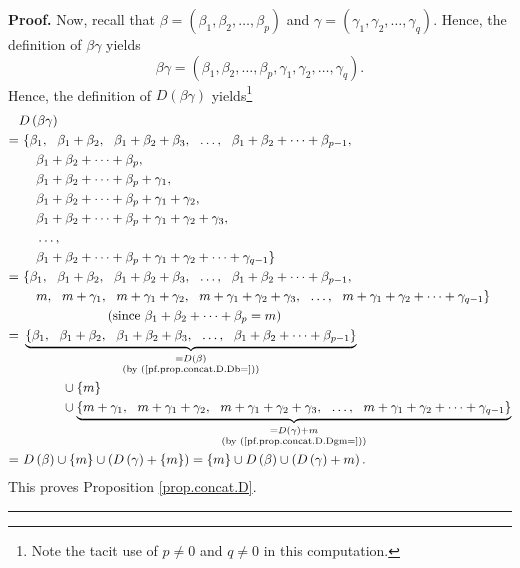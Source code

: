 \documentclass[numbers=enddot,12pt,final,onecolumn,notitlepage]{scrartcl}%
\theoremstyle{definition}
\newenvironment{proof}[1][Proof]{\noindent\textbf{#1.} }{\ \rule{0.5em}{0.5em}}
\begin{document}
\begin{proof}
Now, recall that $\beta=\left(  \beta_{1},\beta_{2},\ldots,\beta_{p}\right)  $
and $\gamma=\left(  \gamma_{1},\gamma_{2},\ldots,\gamma_{q}\right)  $. Hence,
the definition of $\beta\gamma$ yields%
\[
\beta\gamma=\left(  \beta_{1},\beta_{2},\ldots,\beta_{p},\gamma_{1},\gamma
_{2},\ldots,\gamma_{q}\right)  .
\]
Hence, the definition of $D\left(  \beta\gamma\right)  $ yields\footnote{Note
the tacit use of $p\neq0$ and $q\neq0$ in this computation.}%
\begin{align*}
&  D\left(  \beta\gamma\right) \\
=  &  \ \{\beta_{1},\ \ \beta_{1}+\beta_{2},\ \ \beta_{1}+\beta_{2}+\beta
_{3},\ \ \ldots,\ \ \beta_{1}+\beta_{2}+\cdots+\beta_{p-1},\\
&  \ \ \ \ \beta_{1}+\beta_{2}+\cdots+\beta_{p},\\
&  \ \ \ \ \beta_{1}+\beta_{2}+\cdots+\beta_{p}+\gamma_{1},\\
&  \ \ \ \ \beta_{1}+\beta_{2}+\cdots+\beta_{p}+\gamma_{1}+\gamma_{2},\\
&  \ \ \ \ \beta_{1}+\beta_{2}+\cdots+\beta_{p}+\gamma_{1}+\gamma_{2}%
+\gamma_{3},\\
&  \ \ \ \ \ldots,\\
&  \ \ \ \ \beta_{1}+\beta_{2}+\cdots+\beta_{p}+\gamma_{1}+\gamma_{2}%
+\cdots+\gamma_{q-1}\}\\
=  &  \ \{\beta_{1},\ \ \beta_{1}+\beta_{2},\ \ \beta_{1}+\beta_{2}+\beta
_{3},\ \ \ldots,\ \ \beta_{1}+\beta_{2}+\cdots+\beta_{p-1},\\
&  \ \ \ \ m,\ \ m+\gamma_{1},\ \ m+\gamma_{1}+\gamma_{2},\ \ m+\gamma
_{1}+\gamma_{2}+\gamma_{3},\ \ \ldots,\ \ m+\gamma_{1}+\gamma_{2}%
+\cdots+\gamma_{q-1}\}\\
&  \ \ \ \ \ \ \ \ \ \ \ \ \ \ \ \ \ \ \ \ \left(  \text{since }\beta
_{1}+\beta_{2}+\cdots+\beta_{p}=m\right) \\
=  &  \ \underbrace{\left\{  \beta_{1},\ \ \beta_{1}+\beta_{2},\ \ \beta
_{1}+\beta_{2}+\beta_{3},\ \ \ldots,\ \ \beta_{1}+\beta_{2}+\cdots+\beta
_{p-1}\right\}  }_{\substack{=D\left(  \beta\right)  \\\text{(by
(\ref{pf.prop.concat.D.Db=}))}}}\\
&  \ \ \ \ \ \ \ \ \ \ \cup\left\{  m\right\} \\
&  \ \ \ \ \ \ \ \ \ \ \cup\underbrace{\left\{  m+\gamma_{1},\ \ m+\gamma
_{1}+\gamma_{2},\ \ m+\gamma_{1}+\gamma_{2}+\gamma_{3},\ \ \ldots
,\ \ m+\gamma_{1}+\gamma_{2}+\cdots+\gamma_{q-1}\right\}  }%
_{\substack{=D\left(  \gamma\right)  +m\\\text{(by
(\ref{pf.prop.concat.D.Dgm=}))}}}\\
=  &  \ D\left(  \beta\right)  \cup\left\{  m\right\}  \cup\left(  D\left(
\gamma\right)  +\left\{  m\right\}  \right)  =\left\{  m\right\}  \cup
D\left(  \beta\right)  \cup\left(  D\left(  \gamma\right)  +m\right)  .
\end{align*}
This proves Proposition \ref{prop.concat.D}.
\end{proof}
\end{document}
